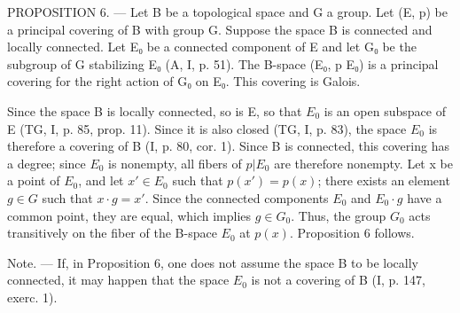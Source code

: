 PROPOSITION 6. --- Let B be a topological space and G a group. Let (E, p) be a principal covering of B with group G. Suppose the space B is connected and locally connected. Let E₀ be a connected component of E and let G₀ be the subgroup of G stabilizing E₀ (A, I, p. 51). The B-space (E₀, p \textbar{} E₀) is a principal covering for the right action of G₀ on E₀. This covering is Galois.

Since the space B is locally connected, so is E, so that \(E_{0}\) is an open subspace of E (TG, I, p. 85, prop. 11). Since it is also closed (TG, I, p. 83), the space \(E_{0}\) is therefore a covering of B (I, p. 80, cor. 1). Since B is connected, this covering has a degree; since \(E_{0}\) is nonempty, all fibers of \(p|E_{0}\) are therefore nonempty. Let x be a point of \(E_{0}\), and let \(x' \in E_{0}\) such that \(p(x') = p(x)\); there exists an element \(g \in G\) such that \(x \cdot g = x'\). Since the connected components \(E_{0}\) and \(E_{0} \cdot g\) have a common point, they are equal, which implies \(g \in G_{0}\). Thus, the group \(G_{0}\) acts transitively on the fiber of the B-space \(E_{0}\) at \(p(x)\). Proposition 6 follows.

Note. --- If, in Proposition 6, one does not assume the space B to be locally connected, it may happen that the space \(E_{0}\) is not a covering of B (I, p. 147, exerc. 1).

